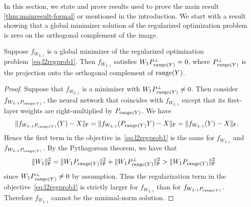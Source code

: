 In this section, we state and prove results used to prove the main result \cref{thm:mainresult-formal} or mentioned in the introduction. We start with a result showing that a global minimizer solution of the regularized optimization problem is zero on the orthogonal complement of the image.
\begin{lemma}\label{lem:robustsolutionofoptproblem}
    Suppose $f_{W_{L:1}}$ is a global minimizer of the regularized optimization problem~\eqref{eq:l2regprob1}.
    Then $f_{W_{L:1}}$ satisfies $W_1P_{\mathrm{range}(Y)}^{\perp}=0$, where $P_{\mathrm{range}(Y)}^{\perp}$ is the projection onto the orthogonal complement of $\mathrm{range}(Y)$.
\end{lemma}
\begin{proof}
Suppose that $f_{W_{L:1}}$ is a minimizer with $W_1P_{\mathrm{range}(Y)}^{\perp} \neq 0$. Then consider $f_{W_{L:1}P_{\mathrm{range}(Y)}}$, the neural network that coincides with $f_{W_{L:1}}$ except that its first-layer weights are right-multiplied by $P_{\mathrm{range}(Y)}$. We have
\begin{align*}
\lVert f_{W_{L:1}P_{\mathrm{range}(Y)}}(Y)-X\rVert_{\mathsf{F}} 
= \lVert f_{W_{L:1}}(P_{\mathrm{range}(Y)}Y)-X\rVert_{\mathsf{F}} 
= \lVert f_{W_{L:1}}(Y)-X\rVert_{\mathsf{F}}. 
\end{align*}
Hence the first term in the objective in~\eqref{eq:l2regprob1} is the same for $f_{W_{L:1}}$ and $f_{W_{L:1}P_{\mathrm{range}(Y)}}$.
By the Pythagorean theorem, we have that
\begin{align*}
    \lVert W_1\rVert_{\mathsf{F}}^2 &=
    \lVert W_1 P_{\mathrm{range}(Y)} \rVert_{\mathsf{F}}^2 +
    \lVert W_1 P_{\mathrm{range}(Y)}^{\perp}\rVert_{\mathsf{F}}^2
    > \lVert W_1 P_{\mathrm{range}(Y)} \rVert_{\mathsf{F}}^2
\end{align*}
since $W_1P_{\mathrm{range}(Y)}^{\perp} \neq 0$ by
assumption. Thus the regularization term in the objective~\eqref{eq:l2regprob1} is strictly larger for $f_{W_{L:1}}$ than for $f_{W_{L:1}P_{\mathrm{range}(Y)}}$. Therefore $f_{W_{L:1}}$ cannot be the minimal-norm solution.
\end{proof}

